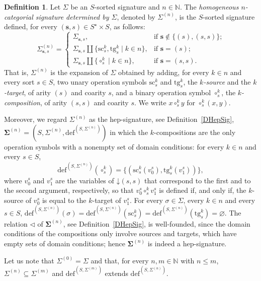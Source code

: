 \documentclass[a4paper, reqno]{amsbook}
\newcommand{\vs}[1]{\mathbin{\downarrow}#1}
\newcommand{\sig}[1]{\mathbf{#1}}             %
\newcommand{\src}{\mathrm{sc}}
\newcommand{\tgt}{\mathrm{tg}}
\theoremstyle{plain}
\theoremstyle{definition}
\newtheorem{definition}[theorem]{Definition}
\begin{document}
\begin{definition}\label{DCatSig}
Let $\Sigma$ be an $S$-sorted signature and $n\in\mathbb{N}$.
The \emph{homogeneous $n$-categorial signature determined by $\Sigma$}, denoted by $\Sigma^{(n)}$, is the $S$-sorted signature defined, for every $(\mathbf{s},s)\in S^{\star}\times S$, as follows:
$$
{\Sigma}^{(n)}_{\mathbf{s},s}=
\begin{cases}
{\Sigma}_{\mathbf{s},s},
& \text{if $\mathbf{s}\not\in \{(s),(s,s)\}$;}\\
{\Sigma}_{\mathbf{s},s}\amalg\{\src^{k}_{s}, \tgt^{k}_{s}\mid k\in n\},
& \text{if $\mathbf{s}= (s)$;}\\
{\Sigma}_{\mathbf{s},s}\amalg\{\circ^{k}_{s}\mid k\in n\},
& \text{if $\mathbf{s}= (s,s)$.}
\end{cases}
$$
That is, ${\Sigma}^{(n)}$ is the expansion of $\Sigma$ obtained by adding, for every $k\in n$ and every sort $s\in S$, two unary operation symbols $\src^{k}_{s}$ and $\tgt^{k}_{s}$, the \emph{$k$-source} and the \emph{$k$-target}, of arity $(s)$ and coarity $s$, and a binary operation symbol $\circ^{k}_{s}$, the \emph{$k$-composition}, of arity $(s,s)$ and coarity $s$.
We write $x\circ^{k}_{s}y$ for $\circ^{k}_{s}(x,y)$.

Moreover, we regard $\Sigma^{(n)}$ as the hep-signature, see Definition~\ref{DHepSig}, $\sig{\Sigma}^{(n)}=(S,\Sigma^{(n)},\mathrm{def}^{(S,\Sigma^{(n)})})$ in which the $k$-compositions are the only operation symbols with a nonempty set of domain conditions: for every $k\in n$ and every $s\in S$,
$$
\mathrm{def}^{(S,\Sigma^{(n)})}(\circ^{k}_{s})=\{(\src^{k}_{s}(v^{s}_{0}),\tgt^{k}_{s}(v^{s}_{1}))\},
$$
where $v^{s}_{0}$ and $v^{s}_{1}$ are the variables of $\vs{(s,s)}$ that correspond to the first and to the second argument, respectively, so that $v^{s}_{0}\circ^{k}_{s}v^{s}_{1}$ is defined if, and only if, the $k$-source of $v^{s}_{0}$ is equal to the $k$-target of $v^{s}_{1}$.
For every $\sigma\in\Sigma$, every $k\in n$ and every $s\in S$, $\mathrm{def}^{(S,\Sigma^{(n)})}(\sigma)=\mathrm{def}^{(S,\Sigma^{(n)})}(\src^{k}_{s})=\mathrm{def}^{(S,\Sigma^{(n)})}(\tgt^{k}_{s})=\varnothing$.
The relation $\lhd$ of $\sig{\Sigma}^{(n)}$, see Definition~\ref{DHepSig}, is well-founded, since the domain conditions of the compositions only involve sources and targets, which have empty sets of domain conditions; hence $\sig{\Sigma}^{(n)}$ is indeed a hep-signature.
\end{definition}

Let us note that $\Sigma^{(0)}=\Sigma$ and that, for every $n,m\in\mathbb{N}$ with $n\leq m$, $\Sigma^{(n)}\subseteq\Sigma^{(m)}$ and $\mathrm{def}^{(S,\Sigma^{(m)})}$ extends $\mathrm{def}^{(S,\Sigma^{(n)})}$.
\end{document}
